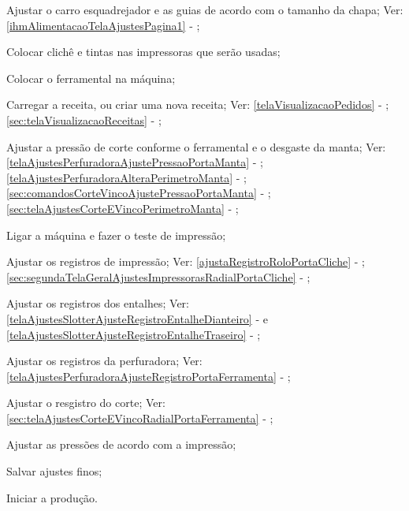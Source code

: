 \begin{procedureAdjustmentRecipe}
  \item[\ding{\dingNumber}] Ajustar o carro esquadrejador e as guias de acordo com o tamanho da chapa; Ver: \ref{ihmAlimentacaoTelaAjustesPagina1} - ;
  \item[\ding{\dingNumber}] Colocar clichê e tintas nas impressoras que serão usadas;
  \item[\ding{\dingNumber}] Colocar o ferramental na máquina;
  \item[\ding{\dingNumber}] Carregar a receita, ou criar uma nova receita; Ver: 
  \ifmachineTypeFlexo
  \ref{telaVisualizacaoPedidos} - ;
  \fi
  \ifmachineTypeIcv
  \ref{sec:telaVisualizacaoReceitas} - ;
  \fi
  \item[\ding{\dingNumber}] Ajustar a pressão de corte conforme o ferramental e o desgaste da manta; Ver: 
  \ifmachineTypeFlexo
  \ref{telaAjustesPerfuradoraAjustePressaoPortaManta} - ;
  \ref{telaAjustesPerfuradoraAlteraPerimetroManta} - ;
  \fi
  \ifmachineTypeIcv
  \ref{sec:comandosCorteVincoAjustePressaoPortaManta} - ;
  \ref{sec:telaAjustesCorteEVincoPerimetroManta} - ;
  \fi
  \item[\ding{\dingNumber}] Ligar a máquina e fazer o teste de impressão;
  \item[\ding{\dingNumber}] Ajustar os registros de impressão; Ver: 
  \ifmachineTypeFlexo
  \ref{ajustaRegistroRoloPortaCliche} - ;
  \fi
  \ifmachineTypeIcv
  \ref{sec:segundaTelaGeralAjustesImpressorasRadialPortaCliche} - ;
  \fi
  \ifmachineTypeFlexo
  \item[\ding{\dingNumber}] Ajustar os registros dos entalhes; Ver: \ref{telaAjustesSlotterAjusteRegistroEntalheDianteiro} -  e \ref{telaAjustesSlotterAjusteRegistroEntalheTraseiro} - ;
  \item[\ding{\dingNumber}] Ajustar os registros da perfuradora; Ver: \ref{telaAjustesPerfuradoraAjusteRegistroPortaFerramenta} - ;
  \fi
  \ifmachineTypeIcv
  \item[\ding{\dingNumber}] Ajustar o resgistro do corte; Ver: \ref{sec:telaAjustesCorteEVincoRadialPortaFerramenta} - ;
  \fi
  \item[\ding{\dingNumber}] Ajustar as pressões de acordo com a impressão;
  \item[\ding{\dingNumber}] Salvar ajustes finos;
  \item[\ding{\dingNumber}] Iniciar a produção.
  
\end{procedureAdjustmentRecipe}

